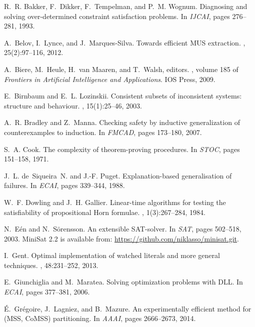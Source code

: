 \documentclass{llncs}
\begin{document}
\begin{thebibliography}{10}
R.~R. Bakker, F.~Dikker, F.~Tempelman, and P.~M. Wognum.
\newblock Diagnosing and solving over-determined constraint satisfaction
  problems.
\newblock In {\em IJCAI}, pages 276--281, 1993.

A.~Belov, I.~Lynce, and J.~Marques{-}Silva.
\newblock Towards efficient {MUS} extraction.
, 25(2):97--116, 2012.

A.~Biere, M.~Heule, H.~van Maaren, and T.~Walsh, editors.
, volume 185 of {\em Frontiers in
  Artificial Intelligence and Applications}. {IOS} Press, 2009.

E.~Birnbaum and E.~L. Lozinskii.
\newblock Consistent subsets of inconsistent systems: structure and behaviour.
, 15(1):25--46, 2003.

A.~R. Bradley and Z.~Manna.
\newblock Checking safety by inductive generalization of counterexamples to
  induction.
\newblock In {\em FMCAD}, pages 173--180, 2007.

S.~A. Cook.
\newblock The complexity of theorem-proving procedures.
\newblock In {\em STOC}, pages 151--158, 1971.

J.~L. de~Siqueira~N. and J.-F. Puget.
\newblock Explanation-based generalisation of failures.
\newblock In {\em ECAI}, pages 339--344, 1988.

W.~F. Dowling and J.~H. Gallier.
\newblock Linear-time algorithms for testing the satisfiability of
  propositional {H}orn formulae.
, 1(3):267--284, 1984.

N.~E{\'{e}}n and N.~S{\"{o}}rensson.
\newblock An extensible {SAT}-solver.
\newblock In {\em SAT}, pages 502--518, 2003.
\newblock MiniSat 2.2 is available from:
  \url{https://github.com/niklasso/minisat.git}.

I.~Gent.
\newblock Optimal implementation of watched literals and more general
  techniques.
, 48:231--252, 2013.

E.~Giunchiglia and M.~Maratea.
\newblock Solving optimization problems with {DLL}.
\newblock In {\em ECAI}, pages 377--381, 2006.

{\'{E}}.~Gr{\'{e}}goire, J.~Lagniez, and B.~Mazure.
\newblock An experimentally efficient method for {(MSS, CoMSS)} partitioning.
\newblock In {\em AAAI}, pages 2666--2673, 2014.


\end{thebibliography}
\end{document}
